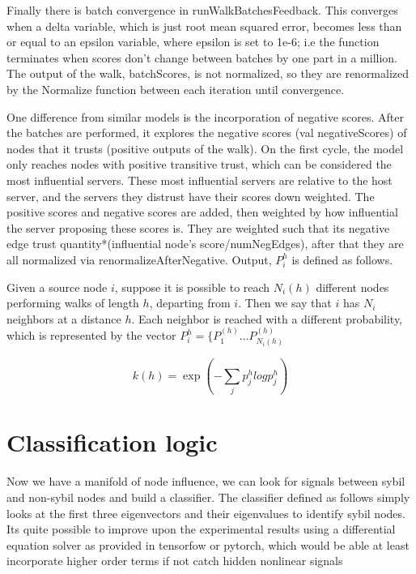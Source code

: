 \documentclass{article}
\begin{document}
Finally there is batch convergence in runWalkBatchesFeedback. This converges when a delta variable, which is just root mean squared error, becomes less than or equal to an epsilon variable, where epsilon is set to 1e-6; i.e the function terminates when scores don’t change between batches by one part in a million. The output of the walk, batchScores, is not normalized, so they are renormalized by the Normalize function between each iteration until convergence.

One difference from similar models is the incorporation of negative scores. After the batches are performed, it explores the negative scores (val negativeScores) of nodes that it trusts (positive outputs of the walk). On the first cycle, the model only reaches nodes with positive transitive trust, which can be considered the most influential servers. These most influential servers are relative to the host server, and the servers they distrust have their scores down weighted. The positive scores and negative scores are added, then weighted by how influential the server proposing these scores is. They are weighted such that its negative edge trust quantity*(influential node’s score/numNegEdges), after that they are all normalized via renormalizeAfterNegative. Output, $P_i^h$ is defined as follows.

Given a source node $i$, suppose it is possible to reach $N_i(h)$ different nodes performing walks of length $h$, departing from $i$. Then we say that $i$ has $N_i$ neighbors at a distance $h$. Each neighbor is reached with a different probability, which is represented by the vector $P_i^h = \{ P_1^(h) \dots P_{N_i(h)}^(h)$
	
	
\begin{equation}
k(h) = \exp (-\sum_j p^{h}_j log p^{h}_j )
\end{equation}

\section{Classification logic}
Now we have a manifold of node influence, we can look for signals between sybil and non-sybil nodes and build a classifier. The classifier defined as follows simply looks at the first three eigenvectors and their eigenvalues to identify sybil nodes. Its quite possible to improve upon the experimental results using a differential equation solver as provided in tensorfow or pytorch, which would be able at least incorporate higher order terms if not catch hidden nonlinear signals
\end{document}
